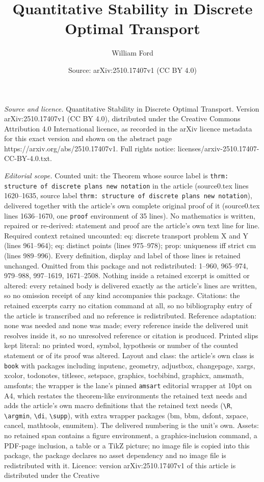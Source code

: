 \documentclass[10pt,a4paper]{amsart}
\title[Quantitative Stability in Discrete Optimal Transport]{Quantitative Stability in Discrete Optimal Transport}
\author{William Ford}
\date{Source: arXiv:2510.17407v1 (CC BY 4.0)}
\begin{document}
\maketitle

\noindent\emph{Source and licence.} Quantitative Stability in Discrete Optimal Transport. Version arXiv:2510.17407v1 (CC BY 4.0), distributed under the Creative Commons Attribution 4.0 International licence, as recorded in the arXiv licence metadata for this exact version and shown on the abstract page https://arxiv.org/abs/2510.17407v1. Full rights notice: licenses/arxiv-2510.17407-CC-BY-4.0.txt.\par\smallskip

\noindent\textit{Editorial scope.} Counted unit: the Theorem whose source label is \texttt{thrm: structure of discrete plans new notation} in the article (source0.tex lines 1620--1635, source label \texttt{thrm: structure of discrete plans new notation}), delivered together with the article's own complete original proof of it (source0.tex lines 1636--1670, one \texttt{proof} environment of 35 lines). No mathematics is written, repaired or re-derived: statement and proof are the article's own text line for line. Required context retained uncounted: eq: discrete transport problem X and Y (lines 961--964); eq: distinct points (lines 975--978); prop: uniqueness iff strict cm (lines 989--996). Every definition, display and label of those lines is retained unchanged. Omitted from this package and not redistributed: 1--960, 965--974, 979--988, 997--1619, 1671--2508. Nothing inside a retained excerpt is omitted or altered: every retained body is delivered exactly as the article's lines are written, so no omission receipt of any kind accompanies this package. Citations: the retained excerpts carry no citation command at all, so no bibliography entry of the article is transcribed and no reference is redistributed. Reference adaptation: none was needed and none was made; every reference inside the delivered unit resolves inside it, so no unresolved reference or citation is produced. Printed slips kept literal: no printed word, symbol, hypothesis or number of the counted statement or of its proof was altered. Layout and class: the article's own class is \texttt{book} with packages including inputenc, geometry, adjustbox, changepage, xargs, xcolor, todonotes, titlesec, setspace, graphics, tocbibind, graphicx, amsmath, amsfonts; the wrapper is the lane's pinned \texttt{amsart} editorial wrapper at 10pt on A4, which restates the theorem-like environments the retained text needs and adds the article's own macro definitions that the retained text needs (\texttt{\textbackslash R}, \texttt{\textbackslash argmin}, \texttt{\textbackslash di}, \texttt{\textbackslash supp}), with extra wrapper packages (bm, bbm, dsfont, xspace, cancel, mathtools, enumitem). The delivered numbering is the unit's own. Assets: no retained span contains a figure environment, a graphics-inclusion command, a PDF-page inclusion, a table or a TikZ picture; no image file is copied into this package, the package declares no asset dependency and no image file is redistributed with it. Licence: version arXiv:2510.17407v1 of this article is distributed under the Creative 
\end{document}
